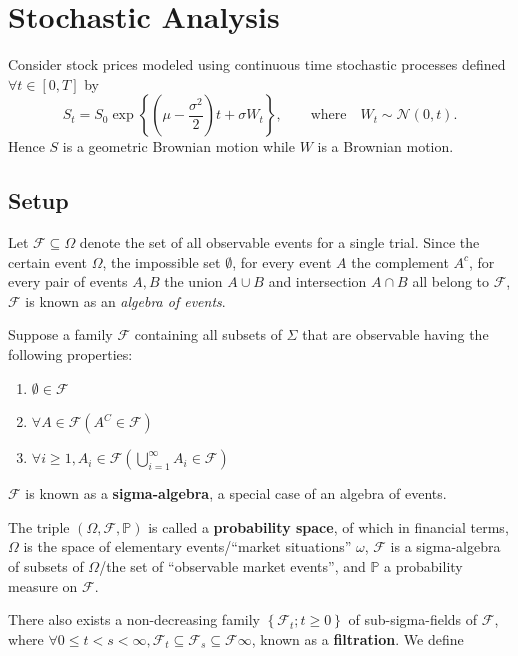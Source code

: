 \section{Stochastic Analysis}
Consider stock prices modeled using continuous time stochastic processes
defined $\forall t\in \left[0,T\right]$ by
\[S_t=S_0\exp{\left\{ \left( \mu-\frac{\sigma^{2}}{2} \right) t+\sigma W_t
\right\}},\qquad \text{where}\quad W_t\sim\mathcal{N}\left( 0,t \right).\]
Hence $S$ is a geometric Brownian motion while $W$ is a Brownian motion.
\subsection{Setup}
Let $\mathcal{F}\subseteq \Omega$ denote the set of all observable events for a
single trial. Since the certain event $\Omega$, the impossible set $\emptyset$,
for every event $A$ the complement $A^{c}$, for every pair of events $A,B$ the
union $A\cup B$ and intersection $A\cap B$ all belong to $\mathcal{F}$,
$\mathcal{F}$ is known as an \textit{algebra of events}.
\begin{definition}
  Suppose a family $\mathcal{F}$ containing all subsets of $\Sigma$ that are observable having the
  following properties:
  \begin{enumerate}
    \item $\emptyset \in \mathcal{F}$
    \item $\forall A\in \mathcal{F}\left( A^{C}\in \mathcal{F}\right)$
    \item $\forall i\ge 1, A_i\in \mathcal{F}\left( \bigcup_{i=1} ^{\infty}A_i\in \mathcal{F}\right)$
  \end{enumerate}
  $\mathcal{F}$ is known as a \textbf{sigma-algebra}, a special case of an
  algebra of events.
\end{definition}
\begin{definition}
  The triple $\left(\Omega,\mathcal{F}, \mathbb{P}\right)$ is called a
  \textbf{probability space}, of which in financial terms, $\Omega$ is the
  space of elementary events/``market situations'' $\omega$, $\mathcal{F}$ is a
  sigma-algebra of subsets of $\Omega$/the set of ``observable market events'',
  and $\mathbb{P}$ a probability measure on $\mathcal{F}$.
\end{definition}
There also exists a non-decreasing family $\left\{ \mathcal{F}_t;t\ge 0 \right\}$ of sub-sigma-fields
of $\mathcal{F}$, where $\forall 0\le t<s<\infty, \mathcal{F}_t\subseteq
\mathcal{F}_s\subseteq \mathcal{F}\infty$, known as a \textbf{filtration}. We define
